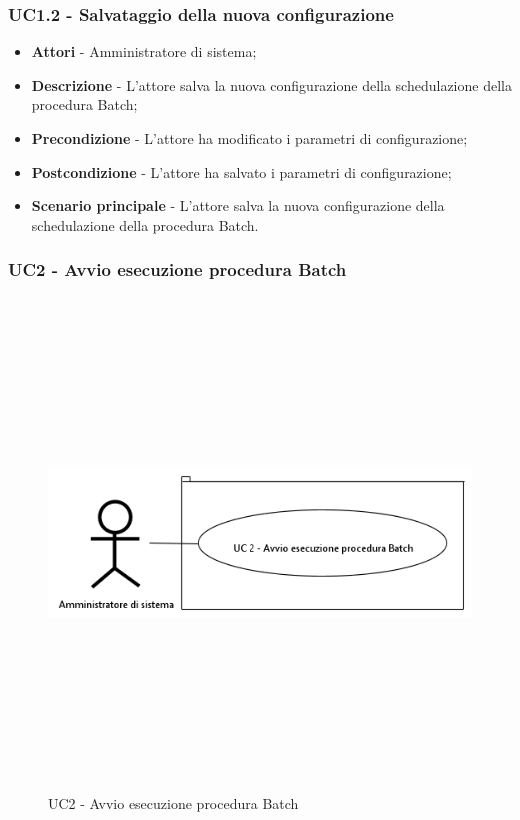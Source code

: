             \subsubsection{UC1.2 - Salvataggio della nuova configurazione}

                \begin{itemize}

                    \item \textbf{Attori} - Amministratore di sistema;
                    \item \textbf{Descrizione} - L'attore salva la nuova configurazione della schedulazione della procedura Batch;
                    \item \textbf{Precondizione} - L'attore ha modificato i parametri di configurazione;
                    \item \textbf{Postcondizione} - L'attore ha salvato i parametri di configurazione;
                    \item \textbf{Scenario principale} - L'attore salva la nuova configurazione della schedulazione della procedura Batch.

                \end{itemize}

\newpage

        \subsubsection{UC2 - Avvio esecuzione procedura Batch}

			\begin{figure}[H]
                \centering
                \includegraphics[width=13cm,height=13cm,keepaspectratio]{./images/UC2.png}
                \caption{UC2 - Avvio esecuzione procedura Batch}
            \end{figure}

